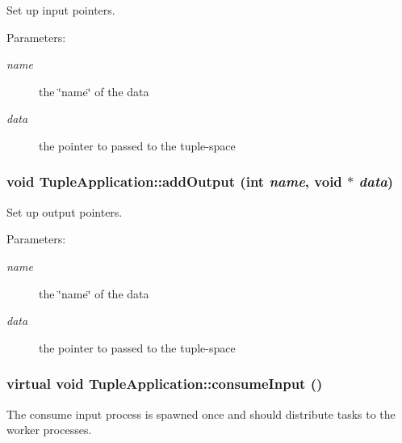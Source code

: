 Set up input pointers. \begin{Desc}
\item[Parameters:]
\begin{description}
\item[{\em name}]the \char`\"{}name\char`\"{} of the data \item[{\em data}]the pointer to passed to the tuple-space \end{description}
\end{Desc}
\hypertarget{class_tuple_application_985c26b37c8040ea51968af9caca9d3b}{
\subsubsection[{addOutput}]{\setlength{\rightskip}{0pt plus 5cm}void TupleApplication::addOutput (int {\em name}, \/  void $\ast$ {\em data})}}
\label{class_tuple_application_985c26b37c8040ea51968af9caca9d3b}


Set up output pointers. \begin{Desc}
\item[Parameters:]
\begin{description}
\item[{\em name}]the \char`\"{}name\char`\"{} of the data \item[{\em data}]the pointer to passed to the tuple-space \end{description}
\end{Desc}
\hypertarget{class_tuple_application_e163c5a536de01c8b94b49528a17dab2}{
\subsubsection[{consumeInput}]{\setlength{\rightskip}{0pt plus 5cm}virtual void TupleApplication::consumeInput ()}}
\label{class_tuple_application_e163c5a536de01c8b94b49528a17dab2}


The consume input process is spawned once and should distribute tasks to the worker processes. 


